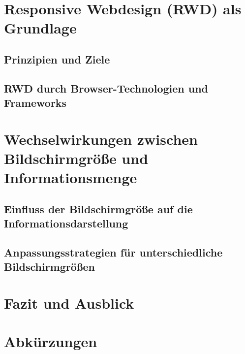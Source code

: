 \documentclass[conference,compsoc,final,a4paper]{IEEEtran}
\begin{document}


    \section{Responsive Webdesign (RWD) als Grundlage}

    \subsection{Prinzipien und Ziele}

    \subsection{RWD durch Browser-Technologien und Frameworks}




    




    \section{Wechselwirkungen zwischen Bildschirmgröße und Informationsmenge}

    \subsection{Einfluss der Bildschirmgröße auf die Informationsdarstellung}

    \subsection{Anpassungsstrategien für unterschiedliche Bildschirmgrößen}




    \section{Fazit und Ausblick}


    \section*{Abkürzungen}

    \begin{acronym}[IEEE]
    \end{acronym}

    \AtNextBibliography{\small}
    \printbibliography
\end{document}
